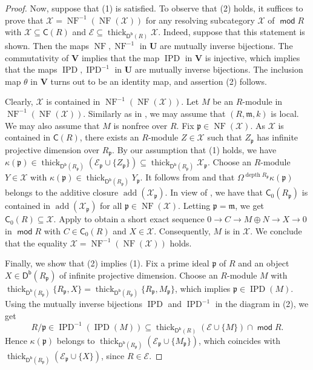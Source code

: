 \documentclass{amsart}
\theoremstyle{definition}
\theoremstyle{remark}
\numberwithin{equation}{thm}
\def\add{\operatorname{add}}
\def\c{\mathsf{C}}
\def\Db{\operatorname{\mathsf{D^b}}}
\def\depth{\operatorname{depth}}
\def\E{\mathcal{E}}
\def\ipd{\operatorname{IPD}}
\def\m{\mathfrak{m}}
\def\mod{\operatorname{\mathsf{mod}}}
\def\nf{\operatorname{NF}}
\def\p{\mathfrak{p}}
\def\syz{\Omega}
\def\thick{\operatorname{thick}}
\def\U{\mathbf{U}}
\def\VV{\mathbf{V}}
\def\X{\mathcal{X}}
\begin{document}
\begin{proof}
Now, suppose that (1) is satisfied.
To observe that (2) holds, it suffices to prove that $\X=\nf^{-1}(\nf(\X))$ for any resolving subcategory $\X$ of $\mod R$ with $\X\subseteq \c(R)$ and $\E\subseteq\thick_{\Db(R)}\X$. 
Indeed, suppose that this statement is shown.
Then the maps $\nf,\nf^{-1}$ in $\U$ are mutually inverse bijections.
The commutativity of $\VV$ implies that the map $\ipd$ in $\VV$ is injective, which implies that the maps $\ipd,\ipd^{-1}$ in $\U$ are mutually inverse bijections.
The inclusion map $\theta$ in $\VV$ turns out to be an identity map, and assertion (2) follows.

Clearly, $\X$ is contained in $\nf^{-1}(\nf(\X))$. 
Let $M$ be an $R$-module in $\nf^{-1}(\nf(\X))$.
Similarly as in \cite[Remark 10.13]{T23}, we may assume that $(R,\m,k)$ is local.
We may also assume that $M$ is nonfree over $R$.
Fix $\p\in\nf(\X)$.
As $\X$ is contained in $\c(R)$, there exists an $R$-module $Z\in\X$ such that $Z_\p$ has infinite projective dimension over $R_\p$.
By our assumption that (1) holds, we have $\kappa(\p)\in\thick_{\Db(R_\p)}(\E_\p\cup\{Z_\p\})\subseteq\thick_{\Db(R_\p)}\X_\p$.
Choose an $R$-module $Y\in\X$ with $\kappa(\p)\in\thick_{\Db(R_\p)}Y_\p$.
It follows from \cite[(4)$\Rightarrow$(1) in Lemma 10.6]{T23} and \cite[Lemma 3.2(1)]{crspd} that $\syz^{\depth R_\p}\kappa(\p)$ belongs to the additive closure $\add(\X_\p)$.
In view of \cite[Remark 3.3(8)]{T23}, we have that $\c_0(R_\p)$ is contained in $\add(\X_\p)$ for all $\p\in\nf(\X)$.
Letting $\p=\m$, we get $\c_0(R)\subseteq\X$.
Apply \cite[Theorem 3.8]{T23} to obtain a short exact sequence $0\to C\to M\oplus N\to X\to0$ in $\mod R$ with $C\in\c_0(R)$ and $X\in\X$.
Consequently, $M$ is in $\X$.
We conclude that the equality $\X=\nf^{-1}(\nf(\X))$ holds.

Finally, we show that (2) implies (1).
Fix a prime ideal $\p$ of $R$ and an object $X\in\Db(R_\p)$ of infinite projective dimension.
Choose an $R$-module $M$ with $\thick_{\Db(R_\p)}\{R_\p, X\}=\thick_{\Db(R_\p)}\{R_\p, M_\p\}$, which implies $\p\in\ipd(M)$.
Using the mutually inverse bijections $\ipd$ and $\ipd^{-1}$ in the diagram in (2), we get
$$
R/\p\in \ipd^{-1}(\ipd(M))\subseteq \thick_{\Db(R)}(\E\cup\{M\})\cap \mod R.
$$
Hence $\kappa(\p)$ belongs to $\thick_{\Db(R_\p)}(\E_\p\cup\{M_\p\})$, which coincides with $\thick_{\Db(R_\p)}(\E_\p\cup\{X\})$, since $R\in\E$.
\end{proof}
\end{document}
